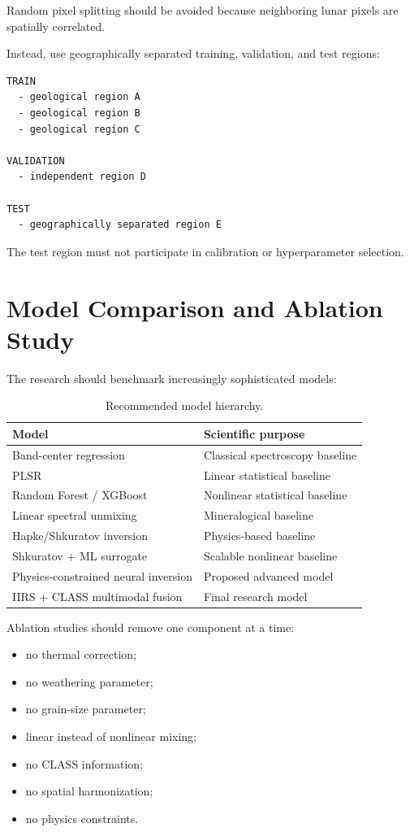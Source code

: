 \documentclass[11pt,a4paper]{article}
\begin{document}
Random pixel splitting should be avoided because neighboring lunar pixels are spatially correlated.

Instead, use geographically separated training, validation, and test regions:

\begin{lstlisting}
TRAIN
  - geological region A
  - geological region B
  - geological region C

VALIDATION
  - independent region D

TEST
  - geographically separated region E
\end{lstlisting}

The test region must not participate in calibration or hyperparameter selection.

\section{Model Comparison and Ablation Study}

The research should benchmark increasingly sophisticated models:

\begin{table}[H]
\centering
\caption{Recommended model hierarchy.}
\begin{tabular}{p{}p{}}
\toprule
Model & Scientific purpose \\
\midrule
Band-center regression & Classical spectroscopy baseline \\
PLSR & Linear statistical baseline \\
Random Forest / XGBoost & Nonlinear statistical baseline \\
Linear spectral unmixing & Mineralogical baseline \\
Hapke/Shkuratov inversion & Physics-based baseline \\
Shkuratov + ML surrogate & Scalable nonlinear baseline \\
Physics-constrained neural inversion & Proposed advanced model \\
IIRS + CLASS multimodal fusion & Final research model \\
\bottomrule
\end{tabular}
\end{table}

Ablation studies should remove one component at a time:

\begin{itemize}
    \item no thermal correction;
    \item no weathering parameter;
    \item no grain-size parameter;
    \item linear instead of nonlinear mixing;
    \item no CLASS information;
    \item no spatial harmonization;
    \item no physics constraints.
\end{itemize}
\end{document}
